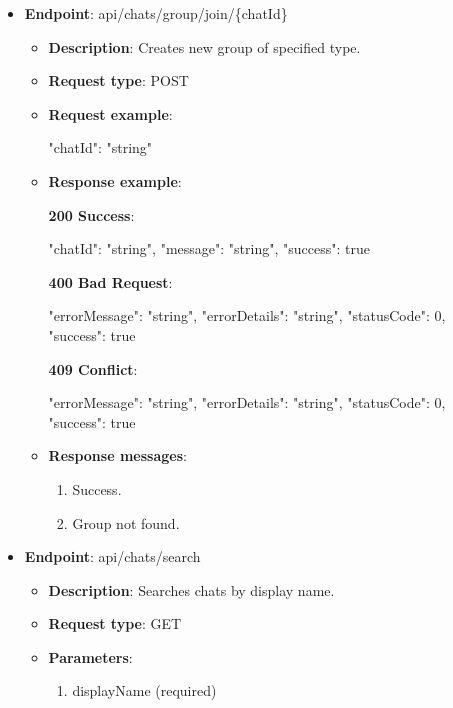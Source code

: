 \begin{itemize}
    \item \textbf{Endpoint}: api/chats/group/join/\{chatId\}
    \begin{itemize}
        \item \textbf{Description}: Creates new group of specified type.
        \item \textbf{Request type}: POST
        \item \textbf{Request example}:
        \begin{spverbatim}
        {
            "chatId": "string"
        }
        \end{spverbatim}

        \item \textbf{Response example}:

        \textbf{200 Success}:

        \begin{spverbatim}
        {
            "chatId": "string",
            "message": "string",
            "success": true
        }
        \end{spverbatim}

        \textbf{400 Bad Request}:

        \begin{spverbatim}
        {
            "errorMessage": "string",
            "errorDetails": "string",
            "statusCode": 0,
            "success": true
        }
        \end{spverbatim}

        \textbf{409 Conflict}:

        \begin{spverbatim}
        {
            "errorMessage": "string",
            "errorDetails": "string",
            "statusCode": 0,
            "success": true
        }
        \end{spverbatim}

        \item \textbf{Response messages}:
        \begin{enumerate}
            \item Success.
            \item Group not found.
        \end{enumerate}
    \end{itemize}

    \item \textbf{Endpoint}: api/chats/search
    \begin{itemize}
        \item \textbf{Description}: Searches chats by display name.
        \item \textbf{Request type}: GET
        \item \textbf{Parameters}:
        \begin{enumerate}
            \item displayName (required)
        \end{enumerate}


\end{itemize}
\end{itemize}
